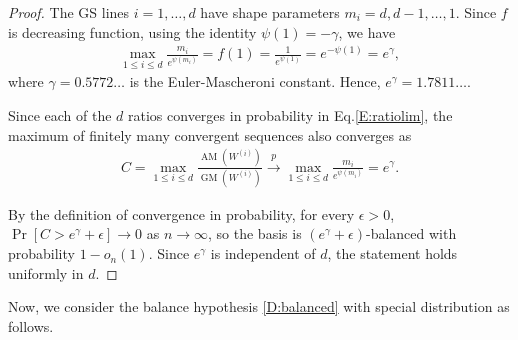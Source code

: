 \documentclass[11pt,a4paper]{article}
\theoremstyle{plain}
\theoremstyle{definition}
\theoremstyle{remark}
\begin{document}
\begin{proof}
The GS lines $i=1, \dots, d$ have shape parameters $m_i=d, d-1, \dots, 1$. Since $f$ is decreasing function, using the identity $\psi(1)=-\gamma$, we have 
\begin{align}
  \max_{1\le i\le d}\frac{m_i}{e^{\psi(m_i)}}=f(1)=\frac{1}{e^{\psi(1)}}=e^{-\psi(1)}=e^{\gamma},
  \label{E:maxline}
\end{align}
where $\gamma=0.5772\ldots$ is the Euler-Mascheroni constant. Hence, $e^{\gamma}=1.7811\ldots$.

Since each of the $d$ ratios converges in probability in Eq.\eqref{E:ratiolim}, the maximum of finitely many convergent sequences also converges as
\begin{align}
  C=\max_{1\le i\le d}
    \frac{\operatorname{AM}(W^{(i)})}{\operatorname{GM}(W^{(i)})}  \xrightarrow{p}\max_{1\le i\le d}\frac{m_i}{e^{\psi(m_i)}}
    =e^{\gamma}.
  \label{E:Climit}
\end{align}

By the definition of convergence in probability, for every $\epsilon>0$,
$\Pr[C>e^{\gamma}+\epsilon]\to0$ as $n\to\infty$, so the basis is
$(e^{\gamma}+\epsilon)$-balanced with probability $1-o_n(1)$. Since
$e^{\gamma}$ is independent of $d$, the statement holds uniformly in $d$.
\end{proof}

Now, we consider the balance hypothesis \ref{D:balanced} with special distribution as follows. 
\end{document}

